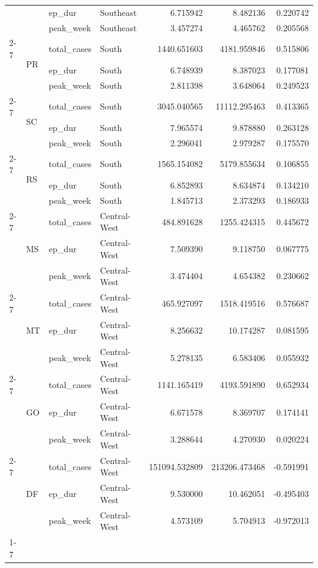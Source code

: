 \documentclass{report}
\begin{document}
\begin{center}
\begin{center}
\begin{longtable}{llllrrr}
 &  & ep\_dur & Southeast & 6.715942 & 8.482136 & 0.220742 \\
 &  & peak\_week & Southeast & 3.457274 & 4.465762 & 0.205568 \\
\cline{2-7}
 & \multirow[t]{3}{*}{PR} & total\_cases & South & 1440.651603 & 4181.959846 & 0.515806 \\
 &  & ep\_dur & South & 6.748939 & 8.387023 & 0.177081 \\
 &  & peak\_week & South & 2.811398 & 3.648064 & 0.249523 \\
\cline{2-7}
 & \multirow[t]{3}{*}{SC} & total\_cases & South & 3045.040565 & 11112.295463 & 0.413365 \\
 &  & ep\_dur & South & 7.965574 & 9.878880 & 0.263128 \\
 &  & peak\_week & South & 2.296041 & 2.979287 & 0.175570 \\
\cline{2-7}
 & \multirow[t]{3}{*}{RS} & total\_cases & South & 1565.154082 & 5179.855634 & 0.106855 \\
 &  & ep\_dur & South & 6.852893 & 8.634874 & 0.134210 \\
 &  & peak\_week & South & 1.845713 & 2.373293 & 0.186933 \\
\cline{2-7}
 & \multirow[t]{3}{*}{MS} & total\_cases & Central-West & 484.891628 & 1255.424315 & 0.445672 \\
 &  & ep\_dur & Central-West & 7.509390 & 9.118750 & 0.067775 \\
 &  & peak\_week & Central-West & 3.474404 & 4.654382 & 0.230662 \\
\cline{2-7}
 & \multirow[t]{3}{*}{MT} & total\_cases & Central-West & 465.927097 & 1518.419516 & 0.576687 \\
 &  & ep\_dur & Central-West & 8.256632 & 10.174287 & 0.081595 \\
 &  & peak\_week & Central-West & 5.278135 & 6.583406 & 0.055932 \\
\cline{2-7}
 & \multirow[t]{3}{*}{GO} & total\_cases & Central-West & 1141.165419 & 4193.591890 & 0.652934 \\
 &  & ep\_dur & Central-West & 6.671578 & 8.369707 & 0.174141 \\
 &  & peak\_week & Central-West & 3.288644 & 4.270930 & 0.020224 \\
\cline{2-7}
 & \multirow[t]{3}{*}{DF} & total\_cases & Central-West & 151094.532809 & 213206.473468 & -0.591991 \\
 &  & ep\_dur & Central-West & 9.530000 & 10.462051 & -0.495403 \\
 &  & peak\_week & Central-West & 4.573109 & 5.704913 & -0.972013 \\
\cline{1-7} \cline{2-7}
\end{longtable}


\end{center}
\end{center}
\end{document}
